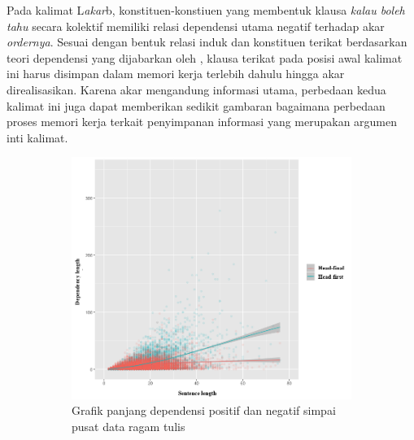 \documentclass[10pt, a4paper, conference, compsocconf]{IEEEtran}
\begin{document}
Pada kalimat L\textit{akar}b, konstituen-konstiuen yang membentuk klausa \textit{kalau boleh tahu} secara kolektif memiliki relasi dependensi utama negatif terhadap akar \textit{ordernya}. Sesuai dengan bentuk relasi induk dan konstituen terikat berdasarkan teori dependensi yang dijabarkan oleh \cite{tesniere1959elements}, klausa terikat pada posisi awal kalimat ini harus disimpan dalam memori kerja terlebih dahulu hingga akar direalisasikan. Karena akar mengandung informasi utama, perbedaan kedua kalimat ini juga dapat memberikan sedikit gambaran bagaimana perbedaan proses memori kerja terkait penyimpanan informasi yang merupakan argumen inti kalimat.

\begin{figure}
\centering

\begin{subfigure}{.7\linewidth}
  \centering
  \includegraphics[width=1\linewidth] {pics/tulisroot_DLposneg.png} 
	\caption{Grafik panjang dependensi positif dan negatif simpai pusat data ragam tulis}
	\label{fig:tulisroot_DLposneg} 
\end{subfigure}
%
\begin{subfigure}{.7\linewidth}
  \centering

\end{subfigure}
\end{figure}
\end{document}
